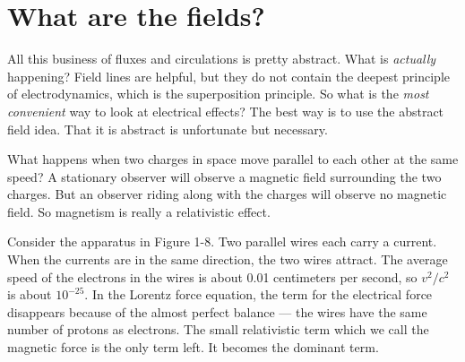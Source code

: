 \section{What are the fields?}

All this business of fluxes and circulations is pretty abstract.
What is \emph{actually} happening?
Field lines are helpful, but they do not contain the deepest principle 
of electrodynamics, which is the superposition principle.
So what is the \emph{most convenient} way to look at electrical effects?
The best way is to use the abstract field idea.
That it is abstract is unfortunate but necessary.

What happens when two charges in space move parallel to each other at the same speed?
A stationary observer will observe a magnetic field surrounding the two charges.
But an observer riding along with the charges will observe no magnetic field.
So magnetism is really a relativistic effect.

Consider the apparatus in Figure 1-8.
Two parallel wires each carry a current.
When the currents are in the same direction, the two wires attract.
The average speed of the electrons in the wires is about 0.01 centimeters per second,
so $v^2/c^2$ is about $10^{-25}$.
In the Lorentz force equation,
the term for the electrical force disappears because of the almost perfect balance --- 
the wires have the same number of protons as electrons.
The small relativistic term which we call the magnetic force is the only term left.
It becomes the dominant term.

